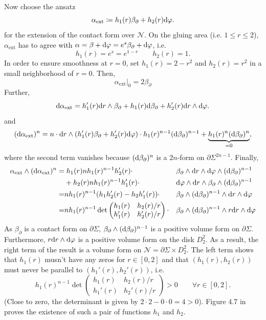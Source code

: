 Now choose the ansatz
\[
    \alpha_\text{ext} \coloneqq h_1(r) \beta_\partial + h_2(r) \mathrm{d}\varphi.
\]
for the extension of the contact form over $\mathcal{N}$.
On the gluing area (i.e. $1 \le r \le 2$), $\alpha_\text{ext}$ has to agree with $\alpha = \beta + \mathrm{d} \varphi = e^s \beta_\partial + \mathrm{d} \varphi$,
i.e.
\[
    h_1(r) = e^s = e^{1-r} \qquad h_2(r) = 1.
\]
In order to ensure smoothness at $r=0$, set $h_1(r) = 2 - r^2$ and $h_2(r) = r^2$ in a small neighborhood of $r = 0$. Then,
\[
    \alpha_\text{ext}|_0 = 2\beta_\partial
\]
Further,
\[
    \mathrm{d} \alpha_\text{ext} = h_1'(r)\mathrm{d} r\wedge \beta_\partial + h_1(r) \mathrm{d} \beta_\partial + h_2'(r) \mathrm{d} r \wedge \mathrm{d}\varphi.
\]
and
\[
    (\mathrm{d} \alpha_\text{ext})^n = n\cdot \mathrm{d} r\wedge (h_1'(r) \beta_\partial + h_2'(r) \mathrm{d}\varphi) \cdot h_1(r)^{n-1}(\mathrm{d} \beta_\partial)^{n-1} + \underbrace{h_1(r)^n (\mathrm{d} \beta_\partial)^n}_{=0},
\]
where the second term vanishes because $(\mathrm{d} \beta_\partial)^n$ is a $2n$-form on $\partial \Sigma^{2n-1}$.
Finally,
\begin{align*}
    \alpha_\text{ext} \wedge (\mathrm{d} \alpha_\text{ext})^n =& \;h_1(r)n h_1(r)^{n-1} h_2'(r) \cdot&&\beta_\partial \wedge \mathrm{d} r \wedge \mathrm{d} \varphi \wedge (\mathrm{d}\beta_\partial)^{n-1}\\
    &+ h_2(r)n h_1(r)^{n-1}h_1'(r) \cdot&&\mathrm{d} \varphi \wedge \mathrm{d} r \wedge \beta_\partial \wedge (\mathrm{d}\beta_\partial)^{n-1}\\
    =& n h_1(r)^{n-1}(h_1h_2'(r) - h_2h_1'(r)) \cdot &&\beta_\partial \wedge (\mathrm{d}\beta_\partial)^{n-1} \wedge \mathrm{d} r \wedge \mathrm{d} \varphi\\
    =& n h_1(r)^{n-1}\det \begin{pmatrix}
        h_1(r) & h_2(r)/r\\
        h_1'(r) & h_2'(r)/r
    \end{pmatrix} \cdot &&\beta_\partial \wedge (\mathrm{d}\beta_\partial)^{n-1} \wedge r \mathrm{d} r \wedge \mathrm{d} \varphi\\
\end{align*}
As $\beta_\partial$ is a contact form on $\partial \Sigma$, $\beta_\partial \wedge (\mathrm{d}\beta_\partial)^{n-1}$ is a positive volume form on $\partial \Sigma$. 
Furthermore, $r \mathrm{d} r\wedge \mathrm{d} \varphi$ is a positive volume form on the disk $D_2^2$. 
As a result, the right term of the result is a volume form on $\mathcal{N} = \partial \Sigma \times D_2^2$.
The left term shows that $h_1(r)$ musn't have any zeros for $r \in [0,2]$ and that $(h_1(r), h_2(r))$ must never be parallel to $(h_1'(r), h_2'(r))$, i.e.
\[
    h_1(r)^{n-1}\det \begin{pmatrix}
        h_1(r) & h_2(r)/r\\
        h_1'(r) & h_2'(r)/r
    \end{pmatrix} > 0 \qquad \forall r \in [0,2].
\]
(Close to zero, the determinant is given by $2 \cdot 2 - 0 \cdot 0 = 4 > 0$).
Figure 4.7 in \cite{Geiges08} proves the existence of such a pair of functions $h_1$ and $h_2$.


